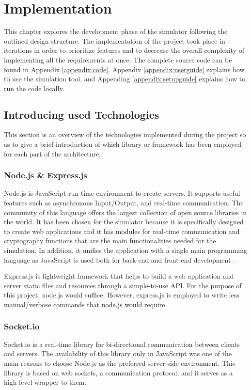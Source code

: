 \chapter{Implementation}
This chapter explores the development phase of the simulator following the outlined design structure. The implementation of the project took place in iterations in order to prioritize features and to decrease the overall complexity of implementing all the requirements at once. The complete source code can be found in Appendix \ref{appendix:code}. Appendix \ref{appendix:userguide} explains how to use the simulation tool, and Appending \ref{appendix:setupguide} explains how to run the code locally.


\section{Introducing used Technologies}
This section is an overview of the technologies implemented during the project so as to give a brief introduction of which library or framework has been employed for each part of the architecture.


\subsection{Node.js \& Express.js}
Node.js is JavaScript run-time environment to create servers. It supports useful features such as asynchronous Input/Output, and real-time communication. The community of this language offers the largest collection of open source libraries in the world. It has been chosen for the simulator because it is specifically designed to create web applications and it has modules for real-time communication and cryptography functions that are the main functionalities needed for the simulation. In addition, it unifies the application with a single main programming language as JavaScript is used both for back-end and front-end development \cite{Nodejs}. 

Express.js is lightweight framework that helps to build a web application and server static files and resources through a simple-to-use API. For the purpose of this project, node.js would suffice. However, express.js is employed to write less manual/verbose commands that node.js would require.

\subsection{Socket.io}
Socket.io is a real-time library for bi-directional communication between clients and servers. The availability of this library only in JavaScript was one of the main reasons to choose Node.js as the preferred server-side environment. This library is based on web sockets, a communication protocol, and it serves as a high-level wrapper to them.

